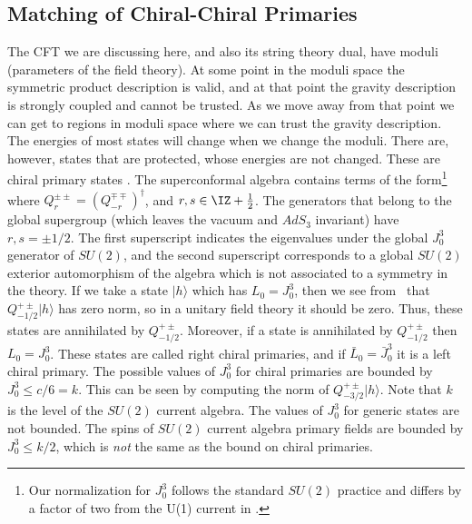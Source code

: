 \subsection{Matching of Chiral-Chiral Primaries }

The CFT we are discussing here, and also its string theory dual, 
have moduli (parameters of the field theory). At some point in the
moduli space
the symmetric product description is valid, and at that point 
the gravity description is strongly coupled and cannot be trusted. 
As we move away from that point we can get to regions in moduli
space where we can trust the gravity description. The energies 
of most states will change when we change the moduli. 
There are, however, states 
that are protected, whose energies are not changed. 
These are chiral primary states \cite{Lerche:1989uy}. 
The superconformal algebra contains  terms of the form\footnote{
Our normalization for $J^3_0$ follows the standard $SU(2)$ practice
and differs by a factor of two from the U(1) current in 
\cite{Lerche:1989uy,Maldacena:1998bw,deBoer:1998ip,deBoer:1998us}.}
where $Q^{\pm\pm}_r = (Q^{\mp\mp}_{-r})^\dagger $, and $r,s \in
\IZ + {1 \over 2} $. The generators that belong to the global
 supergroup (which leaves the vacuum and $AdS_3$ invariant)
have $r, s = \pm 1/2$.  The first superscript indicates 
the eigenvalues under the global $J_0^3$ generator of $SU(2)$, and
the second superscript corresponds to a global $SU(2)$
 exterior automorphism
of the algebra which is not associated to a symmetry in the theory. 
If we take a state $|h\rangle $
 which has $L_0 = J^3_0$, then we see from \suprc\ 
that $ Q^{+\pm}_{-1/2} |h\rangle $ 
has zero norm, so in a unitary field theory
it should be zero. Thus, these states are annihilated by $Q^{+ \pm}_{-1/2}$.
Moreover, if a state is annihilated by $Q^{+ \pm}_{-1/2}$ then 
$L_0 =  J^3_0 $. These states are called right chiral primaries, and
if  $\bar L_0 = {\bar J}_0^3$ it is a left chiral primary. 
  The possible values of $J_0^3 $ for 
chiral primaries are  bounded by  $J_0^3 \leq c/6 =k $. 
This can be seen by 
 computing  the norm of $ Q_{-3/2}^{+\pm} |h\rangle$.
 Note that $k$ is the
level of the $SU(2)$ current algebra. The values of $J_0^3$ for generic 
states are not bounded. The spins of $SU(2)$ current algebra
primary fields are bounded by $J_0^3 \leq k/2 $, which is {\it not}
 the same as the bound on chiral primaries. 

